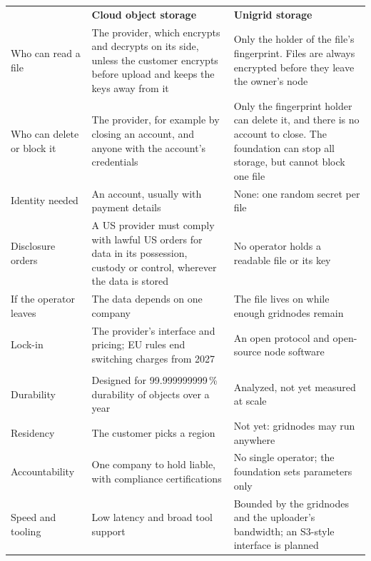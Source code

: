 \documentclass[a4paper,oneside]{article}
\begin{document}
{\renewcommand{\arraystretch}{1.4}
\begin{center}
\small
\begin{tabular}{>{\raggedright\arraybackslash}p{2.5cm}>{\raggedright\arraybackslash}p{4.65cm}>{\raggedright\arraybackslash}p{4.65cm}}
\rowcolor{orange} & \color{black}\textbf{Cloud object storage} & \color{black}\textbf{Unigrid storage} \\
Who can read a file & The provider, which encrypts and decrypts on its side, unless the customer encrypts before upload and keeps the keys away from it \cite{awsS3encryption,awsS3cse} & Only the holder of the file's fingerprint. Files are always encrypted before they leave the owner's node \\
\rowcolor{headerbgl} Who can delete or block it & The provider, for example by closing an account, and anyone with the account's credentials & Only the fingerprint holder can delete it, and there is no account to close. The foundation can stop all storage, but cannot block one file \\
Identity needed & An account, usually with payment details & None: one random secret per file \\
\rowcolor{headerbgl} Disclosure orders & A US provider must comply with lawful US orders for data in its possession, custody or control, wherever the data is stored \cite{usc2713} & No operator holds a readable file or its key \\
If the operator leaves & The data depends on one company & The file lives on while enough gridnodes remain \\
\rowcolor{headerbgl} Lock-in & The provider's interface and pricing; EU rules end switching charges from 2027 \cite{dataact2023} & An open protocol and open-source node software \\
\rowcolor{orange} \multicolumn{3}{l}{\color{black}\textbf{Where the cloud is ahead today}} \\
Durability & Designed for 99.999999999\,\% durability of objects over a year \cite{awsS3durability} & Analyzed, not yet measured at scale \\
\rowcolor{headerbgl} Residency & The customer picks a region & Not yet: gridnodes may run anywhere \\
Accountability & One company to hold liable, with compliance certifications & No single operator; the foundation sets parameters only \\
\rowcolor{headerbgl} Speed and tooling & Low latency and broad tool support & Bounded by the gridnodes and the uploader's bandwidth; an S3-style interface is planned \\
\end{tabular}
\end{center}}
\end{document}
